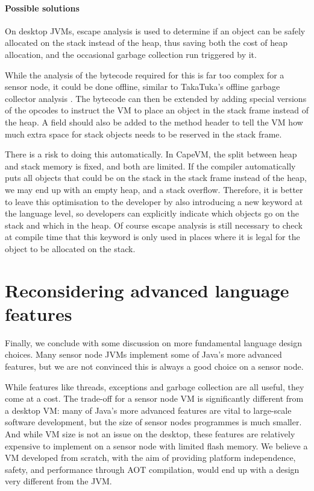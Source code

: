 \paragraph{Possible solutions}
On desktop JVMs, escape analysis \cite{Choi:1999uw, Goetz:2005uy} is used to determine if an object can be safely allocated on the stack instead of the heap, thus saving both the cost of heap allocation, and the occasional garbage collection run triggered by it.

While the analysis of the bytecode required for this is far too complex for a sensor node, it could be done offline, similar to TakaTuka's offline garbage collector analysis \cite{Aslam:2011thesis}. The bytecode can then be extended by adding special versions of the  opcodes to instruct the VM to place an object in the stack frame instead of the heap. A field should also be added to the method header to tell the VM how much extra space for stack objects needs to be reserved in the stack frame.

There is a risk to doing this automatically. In CapeVM, the split between heap and stack memory is fixed, and both are limited. If the compiler automatically puts all objects that could be on the stack in the stack frame instead of the heap, we may end up with an empty heap, and a stack overflow. Therefore, it is better to leave this optimisation to the developer by also introducing a new keyword at the language level, so developers can explicitly indicate which objects go on the stack and which in the heap. Of course escape analysis is still necessary to check at compile time that this keyword is only used in places where it is legal for the object to be allocated on the stack.




\section{Reconsidering advanced language features}
\label{sec-advanced-features}
Finally, we conclude with some discussion on more fundamental language design choices. Many sensor node JVMs implement some of Java's more advanced features, but we are not convinced this is always a good choice on a sensor node.

While features like threads, exceptions and garbage collection are all useful, they come at a cost. The trade-off for a sensor node VM is significantly different from a desktop VM: many of Java's more advanced features are vital to large-scale software development, but the size of sensor nodes programmes is much smaller. And while VM size is not an issue on the desktop, these features are relatively expensive to implement on a sensor node with limited flash memory. We believe a VM developed from scratch, with the aim of providing platform independence, safety, and performance through AOT compilation, would end up with a design very different from the JVM.

